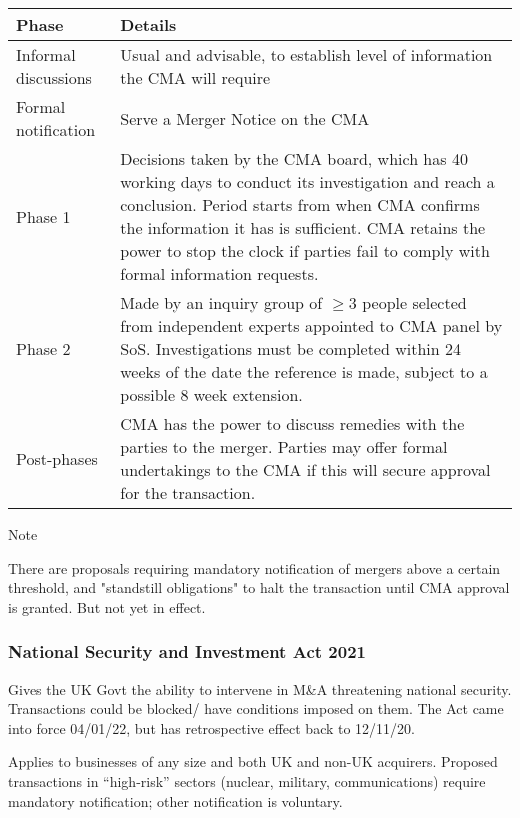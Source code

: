 \documentclass[
]{article}
\newenvironment{env-50f656db-1019-4ecb-abbd-eb2993c53735}
{
    \savenotes\tcolorbox[blanker,breakable,left=5pt,borderline west={2pt}{-4pt}{blue}]
}
{
    \endtcolorbox\spewnotes
}
\begin{document}
\begin{longtable}[]{@{}ll@{}}
\toprule()
Phase & Details \\
\midrule()
\endhead
Informal discussions & Usual and advisable, to establish level of
information the CMA will require \\
Formal notification & Serve a Merger Notice on the CMA \\
Phase 1 & Decisions taken by the CMA board, which has 40 working days to
conduct its investigation and reach a conclusion. Period starts from
when CMA confirms the information it has is sufficient. CMA retains the
power to stop the clock if parties fail to comply with formal
information requests. \\
Phase 2 & Made by an inquiry group of {\(\geq 3\)} people selected from
independent experts appointed to CMA panel by SoS. Investigations must
be completed within 24 weeks of the date the reference is made, subject
to a possible 8 week extension. \\
Post-phases & CMA has the power to discuss remedies with the parties to
the merger. Parties may offer formal undertakings to the CMA if this
will secure approval for the transaction. \\
\bottomrule()
\end{longtable}

\begin{env-50f656db-1019-4ecb-abbd-eb2993c53735}

Note

There are proposals requiring mandatory notification of mergers above a
certain threshold, and "standstill obligations" to halt the transaction
until CMA approval is granted. But not yet in effect.

\end{env-50f656db-1019-4ecb-abbd-eb2993c53735}

\hypertarget{national-security-and-investment-act-2021}{%
\subsubsection{National Security and Investment Act
2021}\label{national-security-and-investment-act-2021}}

Gives the UK Govt the ability to intervene in M\&A threatening national
security. Transactions could be blocked/ have conditions imposed on
them. The Act came into force 04/01/22, but has retrospective effect
back to 12/11/20.

Applies to businesses of any size and both UK and non-UK acquirers.
Proposed transactions in ``high-risk'' sectors (nuclear, military,
communications) require mandatory notification; other notification is
voluntary.
\end{document}
